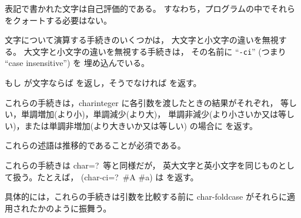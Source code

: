 \sharpsign\backwhack{} 表記で書かれた文字は自己評価的である。
すなわち，プログラムの中でそれらをクォートする必要はない。

\vest 文字について演算する手続きのいくつかは，
大文字と小文字の違いを無視する。
大文字と小文字の違いを無視する手続きは，
その名前に \hbox{``{\tt -ci}''} (つまり ``case insensitive'') を
埋め込んでいる。


\begin{entry}{%
}

もし  が文字ならば \schtrue{} を返し，そうでなければ \schfalse を返す。

\end{entry}


\begin{entry}{%
}

\label{characterequality}

これらの手続きは，{\cf char\coerce{}integer} に各引数を渡したときの結果がそれぞれ，
等しい，単調増加(より小)，単調減少(より大)，
単調非減少(より小さいか又は等しい)，または単調非増加(より大きいか又は等しい)
の場合に \schtrue{} を返す。

これらの述語は推移的であることが必須である。

\end{entry}


\begin{entry}{%
}

これらの手続きは {\cf char=?}\ 等と同様だが，
英大文字と英小文字を同じものとして扱う。たとえば，{\cf
(char-ci=?\ \#\backwhack{}A \#\backwhack{}a)} は \schtrue を返す。

具体的には，これらの手続きは引数を比較する前に
{\cf char-foldcase} がそれらに適用されたかのように振舞う。

\end{entry}


